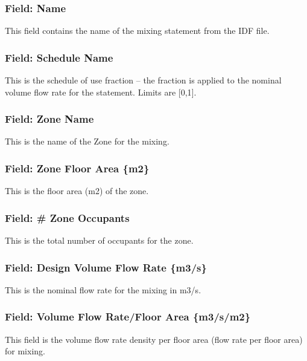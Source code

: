 \subsubsection{Field: Name}\label{field-name-8}

This field contains the name of the mixing statement from the IDF file.

\subsubsection{Field: Schedule Name}\label{field-schedule-name-7}

This is the schedule of use fraction -- the fraction is applied to the nominal volume flow rate for the statement. Limits are {[}0,1{]}.

\subsubsection{Field: Zone Name}\label{field-zone-name-9}

This is the name of the Zone for the mixing.

\subsubsection{Field: Zone Floor Area \{m2\}}\label{field-zone-floor-area-m2-7}

This is the floor area (m2) of the zone.

\subsubsection{Field: \# Zone Occupants}\label{field-zone-occupants-7}

This is the total number of occupants for the zone.

\subsubsection{Field: Design Volume Flow Rate \{m3/s\}}\label{field-design-volume-flow-rate-m3s-2}

This is the nominal flow rate for the mixing in m3/s.

\subsubsection{Field: Volume Flow Rate/Floor Area \{m3/s/m2\}}\label{field-volume-flow-ratefloor-area-m3sm2-2}

This field is the volume flow rate density per floor area (flow rate per floor area) for mixing.


